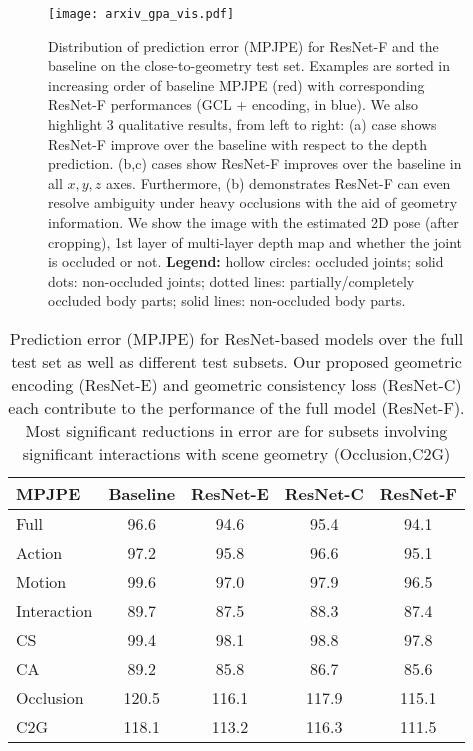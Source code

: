 \documentclass[times,referee,twocolumn,final,authoryear]{elsarticle}
\begin{document}
\begin{figure*}[t]
\begin{center}
   \texttt{[image: arxiv\_gpa\_vis.pdf]}
\end{center}
   \caption{Distribution of prediction error (MPJPE) for ResNet-F and the baseline
   on the close-to-geometry test set. Examples are sorted in increasing order of 
   baseline MPJPE (red) with
   corresponding ResNet-F performances (GCL + encoding, in blue). We also highlight
   3 qualitative results, from left to right:  (a)
   case shows ResNet-F improve over the baseline with respect to the depth
   prediction. (b,c) cases show ResNet-F improves over the baseline in all
   $x,y,z$ axes. Furthermore, (b) demonstrates ResNet-F can even resolve 
   ambiguity under heavy occlusions with the aid of geometry information.  We
   show the image with the estimated 2D pose (after cropping), 1st layer of
   multi-layer depth map and whether the joint is occluded or not.
   \textbf{Legend:} hollow circles: occluded joints; solid dots: non-occluded
   joints; dotted lines: partially/completely occluded body parts; solid lines:
   non-occluded body parts.}
\label{fig:sucvis}
\end{figure*}



\begin{table}[t]
\begin{center}
\small
\begin{tabular}{l|c|c|c|c}
\hline
MPJPE & Baseline & ResNet-E & ResNet-C & ResNet-F \\
\hline
Full & 96.6 & 94.6 &  95.4 & 94.1 \\
\hline\hline
Action & 97.2 & 95.8 & 96.6 & 95.1 \\
Motion & 99.6 & 97.0 & 97.9 & 96.5 \\
Interaction & 89.7 & 87.5 & 88.3 & 87.4 \\
\hline
\hline
CS & 99.4 & 98.1 & 98.8 & 97.8 \\
CA & 89.2 & 85.8 &  86.7 & 85.6 \\
\hline
\hline
Occlusion & 120.5 & 116.1 & 117.9 & 115.1 \\
C2G & 118.1 & 113.2 & 116.3 & 111.5  \\
\hline
\end{tabular}
\end{center}
\caption{Prediction error (MPJPE) for ResNet-based models over the full test set as
well as different test subsets. Our proposed geometric encoding (ResNet-E) and geometric 
consistency loss (ResNet-C) each contribute to the performance of the full model 
(ResNet-F). Most significant reductions in error are for subsets involving significant 
interactions with scene geometry (Occlusion,C2G)}
\label{table:mpjpe-p-resnet}
\end{table}
\end{document}
